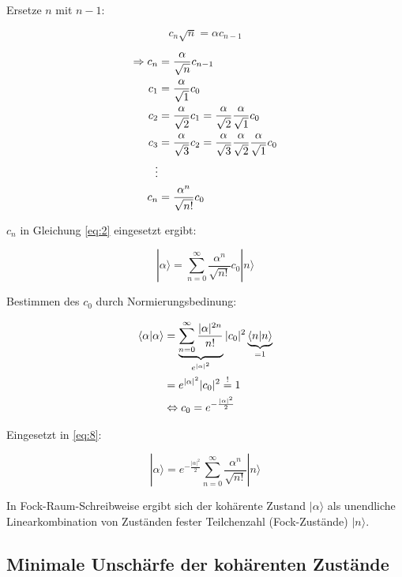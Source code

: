 Ersetze \(n\) mit \(n-1\):

\begin{equation}
  \label{eq:6}
  c_n\sqrt{n} = \alpha c_{n-1}
\end{equation}

\begin{align}
  \label{eq:7}
  \Rightarrow c_n &= \frac{\alpha}{\sqrt{n}}c_{n-1} \notag\\
c_1 &=  \frac{\alpha}{\sqrt{1}}c_{0} \notag\\
c_2 &=  \frac{\alpha}{\sqrt{2}}c_{1} =\frac{\alpha}{\sqrt{2}}\frac{\alpha}{\sqrt{1}}c_{0}  \notag \\
c_3 &=  \frac{\alpha}{\sqrt{3}}c_{2} =  \frac{\alpha}{\sqrt{3}} \frac{\alpha}{\sqrt{2}}\frac{\alpha}{\sqrt{1}}c_{0}  \notag\\
\vdots \notag\\
c_n &=  \frac{\alpha^n}{\sqrt{n!}}c_{0}
\end{align}

\(c_n\) in Gleichung \eqref{eq:2} eingesetzt ergibt:

\begin{equation}
  \label{eq:8}
  |\alpha\rangle =\sum_{n=0}^{\infty} \frac{\alpha^n}{\sqrt{n!}}c_0 |n\rangle 
\end{equation}

Bestimmen des \(c_0\) durch Normierungsbedinung:

\begin{align}
  \label{eq:9}
  \langle \alpha | \alpha \rangle  &= \underbrace{\sum_{n=0}^{\infty} \frac{|\alpha|^{2n}}{n!}}_{e^{|\alpha|^2}} |c_0|^2 \underbrace{\langle n|n\rangle}_{=1} \notag\\
&= e^{|\alpha|^2}|c_0|^2 \stackrel{!}= 1 \notag \\
 &\Leftrightarrow c_0 = e^{-\frac{|\alpha|^2}{2}} 
\end{align}

Eingesetzt in \eqref{eq:8}:

\begin{equation}
  \label{eq:10}
  \boxed{ |\alpha\rangle =  e^{-\frac{|\alpha|^2}{2}} \sum_{n=0}^{\infty} \frac{\alpha^n}{\sqrt{n!}} |n\rangle }
\end{equation}

In Fock-Raum-Schreibweise ergibt sich der kohärente Zustand \(|\alpha\rangle\) als unendliche Linearkombination von Zuständen fester Teilchenzahl (Fock-Zustände) \(|n\rangle\).


\subsection*{Minimale Unschärfe der kohärenten Zustände}

